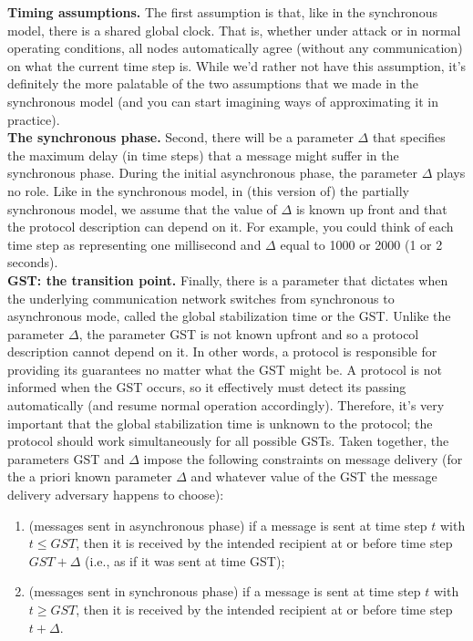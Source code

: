\noindent
\textbf{Timing assumptions.} The first assumption is that, like in the synchronous model, there
is a shared global clock. That is, whether under attack or in normal operating conditions, all
nodes automatically agree (without any communication) on what the current time step is.
While we’d rather not have this assumption, it’s definitely the more palatable of
the two assumptions that we made in the synchronous model (and you can start imagining
ways of approximating it in practice).\\

\noindent
\textbf{The synchronous phase.} Second, there will be a parameter $\Delta$ that specifies the maximum delay (in time steps) that a message might suffer in the synchronous phase. During the
initial asynchronous phase, the parameter $\Delta$ plays no role. Like in the synchronous model,
in (this version of) the partially synchronous model, we assume that the value of $\Delta$ is known
up front and that the protocol description can depend on it. For example, you could think of
each time step as representing one millisecond and $\Delta$ equal to 1000 or 2000 (1 or 2 seconds).\\

\noindent
\textbf{GST: the transition point.} Finally, there is a parameter that dictates when the underlying communication network switches from synchronous to asynchronous mode, called
the global stabilization time or the GST. Unlike the parameter $\Delta$, the parameter GST is not
known upfront and so a protocol description cannot depend on it. In other words, a protocol
is responsible for providing its guarantees no matter what the GST might be. A protocol is not informed when the GST occurs, so it effectively must detect its passing automatically
(and resume normal operation accordingly). Therefore, it's very important that the global stabilization time is unknown to the protocol; the protocol should work
simultaneously for all possible GSTs.
Taken together, the parameters GST and $\Delta$ impose the following constraints on message
delivery (for the a priori known parameter $\Delta$ and whatever value of the GST the message
delivery adversary happens to choose):
\begin{enumerate}
    \item (messages sent in asynchronous phase) if a message is sent at time step $t$ with $t \leq GST$,
then it is received by the intended recipient at or before time step $GST + \Delta$ (i.e., as if
it was sent at time GST);
    \item (messages sent in synchronous phase) if a message is sent at time step $t$ with $t \geq GST$,
then it is received by the intended recipient at or before time step $t + \Delta$.
\end{enumerate}

